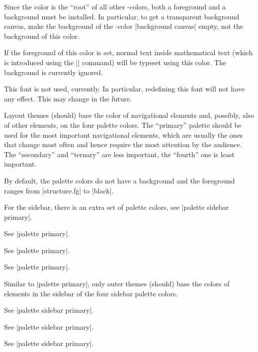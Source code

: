 \begin{itemize}
  Since the color is the ``root'' of all other \beamer-colors, both a
  foreground and a background must be installed. In particular, to get
  a transparent background canvas, make the background of the
  \beamer-color |background canvas| empty, not the background of this
  color.

  \no\yes\no
  If the foreground of this color is set, normal text inside
  mathematical text (which is introduced using the |\text| command)
  will be typeset using this color. The background is currently
  ignored. 

  \fontnote
  This font is not used, currently. In particular, redefining this
  font will not have any effect. This may change in the future.

  \no\yes\no
  Layout themes (should) base the color of navigational elements and,
  possibly, also of other elements, on the four palette colors. The
  ``primary'' palette should be used for the most important
  navigational elements, which are usually the ones that change most
  often and hence require the most attention by the audience. The
  ``secondary'' and ``ternary'' are less important, the ``fourth'' one
  is least important.

  By default, the palette colors do not have a background and the
  foreground ranges from |structure.fg| to |black|.

  For the sidebar, there is an extra set of palette colors, see
  |palette sidebar primary|. 

  \no\yes\no
  See |palette primary|.

  \no\yes\no
  See |palette primary|.

  \no\yes\no
  See |palette primary|.

  \no\yes\no
  Similar to |palette primary|, only outer themes (should) base the
  colors of elements in the sidebar of the four sidebar palette
  colors.

  \no\yes\no
  See |palette sidebar primary|.

  \no\yes\no
  See |palette sidebar primary|.

  \no\yes\no
  See |palette sidebar primary|.
  


\end{itemize}
